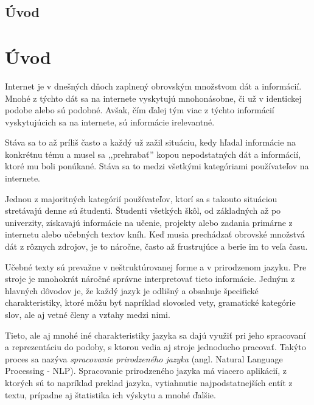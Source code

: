 \newpage
{}
{
	\section{Úvod}
}
{
	\chapter{Úvod}
}
Internet je v dnešných dňoch zaplnený obrovským množstvom dát a informácií. Mnohé z týchto dát sa na internete vyskytujú mnohonásobne, či už v identickej podobe alebo sú podobné. Avšak, čím ďalej tým viac z týchto informácií vyskytujúcich sa na internete, sú informácie irelevantné.

Stáva sa to až príliš často a každý už zažil situáciu, kedy hľadal informácie na konkrétnu tému a musel sa ,,prehrabať'' kopou nepodstatných dát a informácií, ktoré mu boli ponúkané. Stáva sa to medzi všetkými kategóriami používateľov na internete.

Jednou z majoritných kategórií používateľov, ktorí sa s takouto situáciou stretávajú denne sú študenti. Študenti všetkých škôl, od základných až po univerzity, získavajú informácie na učenie, projekty alebo zadania primárne z internetu alebo učebných textov kníh. Keď musia prechádzať obrovské množstvá dát z rôznych zdrojov, je to náročne, často až frustrujúce a berie im to veľa času.

Učebné texty sú prevažne v neštruktúrovanej forme a v prirodzenom jazyku. Pre stroje je mnohokrát náročné správne interpretovať tieto informácie. Jedným z hlavných dôvodov je, že každý jazyk je odlišný a obsahuje špecifické charakteristiky, ktoré môžu byť napríklad slovosled vety, gramatické kategórie slov, ale aj vetné členy a vzťahy medzi nimi.

Tieto, ale aj mnohé iné charakteristiky jazyka sa dajú využiť pri jeho spracovaní a reprezentáciu do podoby, s ktorou vedia aj stroje jednoducho pracovať. Takýto proces sa nazýva \textit{spracovanie prirodzeného jazyka} (angl. Natural Language Processing - NLP). Spracovanie prirodzeného jazyka má viacero aplikácií, z ktorých sú to napríklad preklad jazyka, vytiahnutie najpodstatnejších entít z textu, prípadne aj štatistika ich výskytu a mnohé ďalšie.

